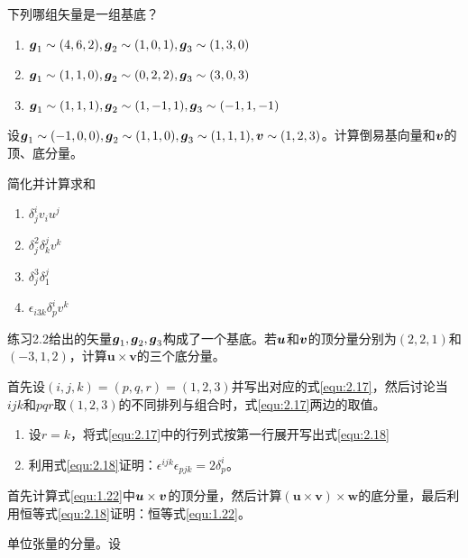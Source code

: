 \begin{exercise}
    \item 下列哪组矢量是一组基底？
    \begin{enumerate}
        \item $\boldsymbol{g}_1\sim (4,6,2),\boldsymbol{g}_2\sim (1,0,1),\boldsymbol{g}_3\sim (1,3,0)$
        \item $\boldsymbol{g}_1\sim (1,1,0),\boldsymbol{g}_2\sim (0,2,2),\boldsymbol{g}_3\sim (3,0,3)$
        \item $\boldsymbol{g}_1\sim (1,1,1),\boldsymbol{g}_2\sim (1,-1,1),\boldsymbol{g}_3\sim (-1,1,-1)$
    \end{enumerate}
    \item 设$\boldsymbol{g}_1\sim (-1,0,0) , \boldsymbol{g}_2\sim (1,1,0) , \boldsymbol{g}_3\sim (1,1,1) , \boldsymbol{v}\sim (1,2,3)$。计算倒易基向量和$\boldsymbol{v}$的顶、底分量。
    \item 简化并计算求和
    \begin{enumerate}
        \item $\delta _{j}^{i}v_iu^j$
        \item $\delta _{j}^{2}\delta _{k}^{j}v^k$
        \item $\delta _{j}^{3}\delta _{1}^{j}$
        \item $\epsilon _{i3k}\delta _{p}^{i}v^k$
    \end{enumerate}
    \item 练习2.2给出的矢量$\boldsymbol{g}_1,\boldsymbol{g}_2,\boldsymbol{g}_3$构成了一个基底。若$\boldsymbol{u}$和$\boldsymbol{v}$的顶分量分别为$\left( 2,2,1 \right) $和$\left( -3,1,2 \right) $，计算$\boldsymbol{u}\times \boldsymbol{v}$的三个底分量。
    \item 首先设$\left( i,j,k \right) =\left( p,q,r \right) =\left( 1,2,3 \right) $并写出对应的式\eqref{equ:2.17}，然后讨论当$ijk$和$pqr$取$(1,2,3)$的不同排列与组合时，式\eqref{equ:2.17}两边的取值。
    \item \begin{enumerate}
        \item 设$r=k$，将式\eqref{equ:2.17}中的行列式按第一行展开写出式\eqref{equ:2.18}
        \item 利用式\eqref{equ:2.18}证明：$\epsilon ^{ijk}\epsilon _{pjk}=2\delta _{p}^{i}$。
    \end{enumerate}
    \item 首先计算式\eqref{equ:1.22}中$\boldsymbol{u}\times \boldsymbol{v}$的顶分量，然后计算$\left( \boldsymbol{u}\times \boldsymbol{v} \right) \times \boldsymbol{w}$的底分量，最后利用恒等式\eqref{equ:2.18}证明：恒等式\eqref{equ:1.22}。
    \item 单位张量的分量。设
    \begin{equation*}

\end{equation*}
\end{exercise}
